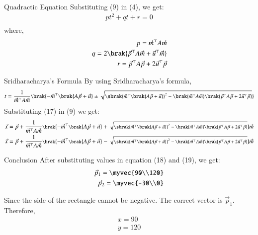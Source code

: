 \documentclass{beamer}
\begin{document}
\begin{frame}{Quadractic Equation}
Substituting (9) in (4), we get:
\begin{align}
    pt^2+qt+r=0\\
\end{align}
where,
\begin{align}
    p=\vec{m}^\top A\vec{m}\\
    q=2\brak{\vec{p}^\top A\vec{m}+\vec{u}^\top\vec{m}}\\
    r=\vec{p}^\top A\vec{p}+2\vec{u}^\top\vec{p}
\end{align}
\end{frame}

\begin{frame}{Sridharacharya's Formula}
By using Sridharacharya's formula,
\begin{align}
    \small{t=\frac{1}{\vec{m}^\top A\vec{m}}\brak{-\vec{m}^\top\brak{A\vec{p}+\vec{u}}\pm\sqrt{\sbrak{\vec{m}^\top\brak{A\vec{p}+\vec{u}}}^2-\brak{\vec{m}^\top A\vec{m}}\brak{\vec{p}^\top A\vec{p}+2\vec{u}^\top\vec{p}}}}}
\end{align}
Substituting (17) in (9) we get:
\begin{align}
    \footnotesize{\vec{x}= \vec{p}+\frac{1}{\vec{m}^\top A\vec{m}}\brak{-\vec{m}^\top\brak{A\vec{p}+\vec{u}}+\sqrt{\sbrak{\vec{m}^\top\brak{A\vec{p}+\vec{u}}}^2-\brak{\vec{m}^\top A\vec{m}}\brak{\vec{p}^\top A\vec{p}+2\vec{u}^\top\vec{p}}}}\vec{m}}\\
    \footnotesize{\vec{x}= \vec{p}+\frac{1}{\vec{m}^\top A\vec{m}}\brak{-\vec{m}^\top\brak{A\vec{p}+\vec{u}}-\sqrt{\sbrak{\vec{m}^\top\brak{A\vec{p}+\vec{u}}}^2-\brak{\vec{m}^\top A\vec{m}}\brak{\vec{p}^\top A\vec{p}+2\vec{u}^\top\vec{p}}}}\vec{m}}
\end{align}
\end{frame}

\begin{frame}{Conclusion}
    After substituting values in equation (18) and (19), we get:
\begin{align}
    \vec{p}_1 = \myvec{90\\120}\\
    \vec{p}_2 = \myvec{-30\\0}
\end{align}

Since the side of the rectangle cannot be negative. The correct vector is $\vec{p}_1$.\\ Therefore,
\begin{align}
    x = 90\\
    y = 120
\end{align}
\end{frame}
\end{document}
